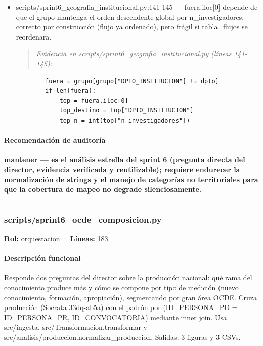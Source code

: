\begin{tcolorbox}[riesgo]
\begin{itemize}
  \item scripts/sprint6\_geografia\_institucional.py:141-145 --- fuera.iloc[0] depende de que el grupo mantenga el orden descendente global por n\_investigadores; correcto por construcción (flujo ya ordenado), pero frágil si tabla\_flujos se reordenara.
\begin{quote}\footnotesize\ttfamily
\noindent\emph{Evidencia en scripts/sprint6\_geografia\_institucional.py (líneas 141-145):}
\end{quote}
\begin{lstlisting}
        fuera = grupo[grupo["DPTO_INSTITUCION"] != dpto]
        if len(fuera):
            top = fuera.iloc[0]
            top_destino = top["DPTO_INSTITUCION"]
            top_n = int(top["n_investigadores"])
\end{lstlisting}

\end{itemize}
\end{tcolorbox}

\paragraph{Recomendación de auditoría}
\textbf{mantener --- es el análisis estrella del sprint 6 (pregunta directa del director, evidencia verificada y reutilizable); requiere endurecer la normalización de strings y el manejo de categorías no territoriales para que la cobertura de mapeo no degrade silenciosamente.}

\medskip
\hrule

\subsubsection{scripts/sprint6\_ocde\_composicion.py}
\textbf{Rol:} orquestacion · \textbf{Líneas:} 183

\paragraph{Descripción funcional}
Responde dos preguntas del director sobre la producción nacional: qué rama del conocimiento produce más y cómo se compone por tipo de medición (nuevo conocimiento, formación, apropiación), segmentando por gran área OCDE. Cruza producción (Socrata 33dq-ab5a) con el padrón por (ID\_PERSONA\_PD = ID\_PERSONA\_PR, ID\_CONVOCATORIA) mediante inner join. Usa src/ingesta, src/Transformacion.transformar y src/analisis/produccion.normalizar\_produccion. Salidas: 3 figuras y 3 CSVs.

